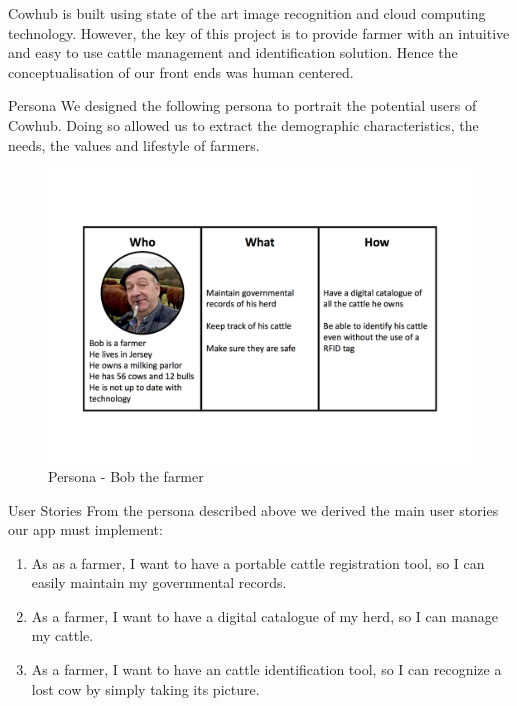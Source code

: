 %

Cowhub is built using state of the art image recognition and cloud computing technology. However, the key of this project is to provide farmer with an intuitive and easy to use cattle management and identification solution. Hence the conceptualisation of our front ends was human centered.


\begin{subsection}{Persona}
  We designed the following persona to portrait the potential users of Cowhub. Doing so allowed us to extract the demographic characteristics, the needs, the values and lifestyle of farmers.
  \begin{figure}[H]
  	\centering
    \includegraphics[width=1\textwidth]{images/persona.png}
  	\caption[Persona]{Persona - Bob the farmer}
  \end{figure}
\end{subsection}


\begin{subsection}{User Stories}
  From the persona described above we derived the main user stories our app must implement:
  \begin{enumerate}
    \item As as a farmer, I want to have a portable cattle registration tool, so I can easily maintain my governmental records.
    \item As a farmer, I want to have a digital catalogue of my herd, so I can manage my cattle.
    \item As a farmer, I want to have an cattle identification tool, so I can recognize a lost cow by simply taking its picture.
  \end{enumerate}
\end{subsection}

